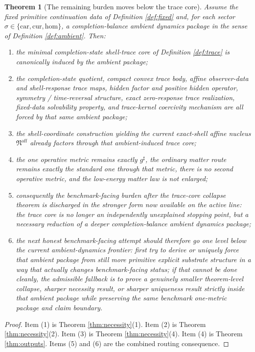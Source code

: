 \documentclass[11pt]{article}
\newcommand{\CompletedMetric}{g^{\sharp}}
\newcommand{\AffineNucleus}{\mathfrak N^{\mathrm{aff}}}
\newcommand{\Car}{\mathrm{car}}
\newcommand{\Cur}{\mathrm{cur}}
\newcommand{\Hom}{\mathrm{hom}}
\newtheorem{theorem}{Theorem}
\begin{document}
\begin{theorem}[The remaining burden moves below the trace core]
\label{thm:main}
Assume the fixed primitive continuation data of Definition \ref{def:fixed} and, for each sector \(\sigma\in\{\Car,\Cur,\Hom\}\), a completion-balance ambient dynamics package in the sense of Definition \ref{def:ambient}. Then:
\begin{enumerate}
    \item the minimal completion-state shell-trace core of Definition \ref{def:trace} is canonically induced by the ambient package;
    \item the completion-state quotient, compact convex trace body, affine observer-data and shell-response trace maps, hidden factor and positive hidden operator, symmetry / time-reversal structure, exact zero-response trace realization, fixed-data solvability property, and trace-kernel coercivity mechanism are all forced by that same ambient package;
    \item the shell-coordinate construction yielding the current exact-shell affine nucleus \(\AffineNucleus\) already factors through that ambient-induced trace core;
    \item the one operative metric remains exactly \(\CompletedMetric\), the ordinary matter route remains exactly the standard one through that metric, there is no second operative metric, and the low-energy matter law is not enlarged;
    \item consequently the benchmark-facing burden after the trace-core collapse theorem is discharged in the stronger form now available on the active line: the trace core is no longer an independently unexplained stopping point, but a necessary reduction of a deeper completion-balance ambient dynamics package;
    \item the next honest benchmark-facing attempt should therefore go one level below the current ambient-dynamics frontier: first try to derive or uniquely force that ambient package from still more primitive explicit substrate structure in a way that actually changes benchmark-facing status; if that cannot be done cleanly, the admissible fallback is to prove a genuinely smaller theorem-level collapse, sharper necessity result, or sharper uniqueness result strictly inside that ambient package while preserving the same benchmark one-metric package and claim boundary.
\end{enumerate}
\end{theorem}

\begin{proof}
Item (1) is Theorem \ref{thm:necessity}(1). Item (2) is Theorem \ref{thm:necessity}(2). Item (3) is Theorem \ref{thm:necessity}(4). Item (4) is Theorem \ref{thm:outputs}. Items (5) and (6) are the combined routing consequence.
\end{proof}
\end{document}
